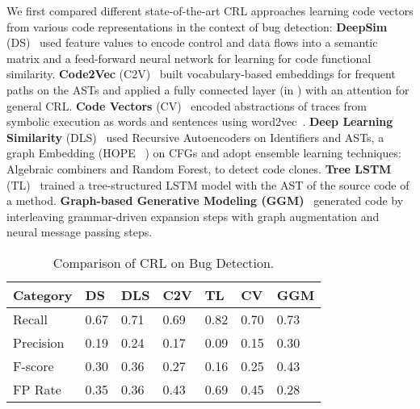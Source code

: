 We first compared different state-of-the-art CRL approaches learning
code vectors from various code representations in the context of bug
detection: \textbf{DeepSim} (DS)~\cite{Zhao-2018} used feature values
to encode control and data flows into a semantic matrix and a
feed-forward neural network for learning for code functional
similarity.  \textbf{Code2Vec} (C2V)~\cite{Alon-2018} built
vocabulary-based embeddings for frequent paths on the ASTs and applied
a fully connected layer (in \cnn) with an attention for general
CRL. \textbf{Code Vectors} (CV)~\cite{Henkel-2018} encoded
abstractions of traces from symbolic execution as words and sentences
using word2vec~\cite{word2vec}.  \textbf{Deep Learning Similarity}
(DLS)~\cite{Tufano-2018} used Recursive Autoencoders on Identifiers
and ASTs, a graph Embedding (HOPE~ \cite{goyal2018graph}) on CFGs and
adopt ensemble learning techniques: Algebraic combiners and Random
Forest, to detect code clones. \textbf{Tree LSTM} (TL)~\cite{Tai-2015}
trained a tree-structured LSTM model with the AST of the source code
of a method.  \textbf{Graph-based Generative Modeling
  (GGM)}~\cite{brockschmidt2018generative} generated code by
interleaving grammar-driven expansion steps with graph augmentation
and neural message passing steps.


\begin{wraptable}{r}{6.8cm}
		\vspace{-20pt}
	{\footnotesize	
	\caption{Comparison of CRL on Bug Detection.}
		\vspace{-10pt}
	\begin{center}
	
		\renewcommand{\arraystretch}{1}
		\begin{tabular}{p{1.2cm}<{\centering}|p{0.8cm}<{\centering}|p{0.8cm}<{\centering}|p{0.8cm}<{\centering}|p{0.8cm}<{\centering}|p{0.8cm}<{\centering}|p{1cm}<{\centering}}
			\hline
			\textbf{Category} & \textbf{DS} & \textbf{DLS} & \textbf{C2V} & \textbf{TL} & \textbf{CV} & \textbf{GGM}\\
			\hline
			Recall & 0.67 & 0.71 & 0.69 & 0.82 & 0.70&0.73\\
			Precision & 0.19 & 0.24 & 0.17 & 0.09 & 0.15&0.30\\
			F-score & 0.30 & 0.36 & 0.27 & 0.16 & 0.25&0.43\\
			FP Rate & 0.35 & 0.36 & 0.43 & 0.69 & 0.45 &0.28\\
			\hline
		\end{tabular}
		\label{RQ2_cross}

	\end{center}
}
	\vspace{-20pt}
\end{wraptable}

